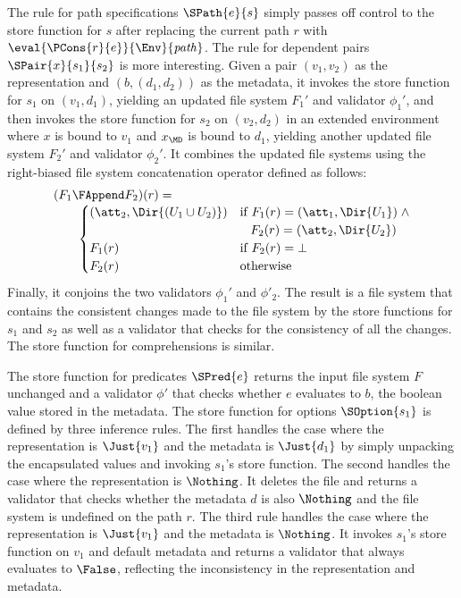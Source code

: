 The rule for path specifications $\SPath{e}{s}$ simply passes off
control to the store function for $s$ after replacing the current path
$r$ with $\eval{\PCons{r}{e}}{\Env}{\mathit{path}}$. The rule for
dependent pairs $\SPair{x}{s_1}{s_2}$ is more interesting. Given a
pair $(v_1,v_2)$ as the representation and $(b,(d_1,d_2))$ as the
metadata, it invokes the store function for $s_1$ on $(v_1,d_1)$,
yielding an updated file system $F_1'$ and validator $\phi_1'$, and
then invokes the store function for $s_2$ on $(v_2,d_2)$ in an
extended environment where $x$ is bound to $v_1$ and $x_{\MD}$ is
bound to $d_1$, yielding another updated file system $F_2'$ and
validator $\phi_2'$. It combines the updated file systems using the
right-biased file system concatenation operator defined as follows:
%
\[
\begin{array}{l}
(F_1 \FAppend F_2)(r) = \\
\qquad 
\begin{cases}
  (\att_2,\Dir{(U_1 \cup U_2)}) & \text{if}~F_1(r) = (\att_1,\Dir{U_1}) \; \wedge \\
                              & \;\;\; F_2(r) = (\att_2,\Dir{U_2})\\
  F_1(r) & \text{if}~F_2(r) = \bot\\
  F_2(r) & \text{otherwise}\\
\end{cases}
\end{array}
\]
%
Finally, it conjoins the two validators $\phi_1'$ and $\phi'_2$. The
result is a file system that contains the consistent changes made to
the file system by the store functions for $s_1$ and $s_2$ as well as
a validator that checks for the consistency of all the changes. The
store function for comprehensions is similar.

The store function for predicates $\SPred{e}$ returns the input file
system $F$ unchanged and a validator $\phi'$ that checks whether $e$
evaluates to $b$, the boolean value stored in the metadata. The store
function for options $\SOption{s_1}$ is defined by three inference
rules. The first handles the case where the representation is
$\Just{v_1}$ and the metadata is $\Just{d_1}$ by simply unpacking the
encapsulated values and invoking $s_1$'s store function. The second
handles the case where the representation is $\Nothing$. It deletes
the file and returns a validator that checks whether the metadata $d$
is also $\Nothing$ and the file system is undefined on the path
$r$. The third rule handles the case where the representation is
$\Just{v_1}$ and the metadata is $\Nothing$. It invokes $s_1$'s store
function on $v_1$ and default metadata and returns a validator that
always evaluates to $\False$, reflecting the inconsistency in the
representation and metadata.

